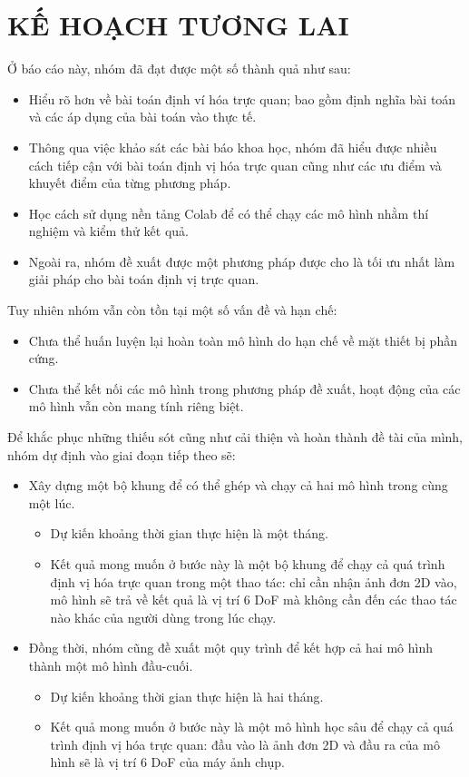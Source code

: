 \chapter{KẾ HOẠCH TƯƠNG LAI}

Ở báo cáo này, nhóm đã đạt được một số thành quả như sau:
\begin{itemize}
	\item Hiểu rõ hơn về bài toán định ví hóa trực quan; bao gồm định nghĩa bài toán và các áp dụng của bài toán vào thực tế.
	\item Thông qua việc khảo sát các bài báo khoa học, nhóm đã hiểu được nhiều cách tiếp cận với bài toán định vị hóa trực quan cũng như các ưu điểm và khuyết điểm của từng phương pháp.
	\item Học cách sử dụng nền tảng Colab để có thể chạy các mô hình nhằm thí nghiệm và kiểm thử kết quả.
	\item Ngoài ra, nhóm đề xuất được một phương pháp được cho là tối ưu nhất làm giải pháp cho bài toán định vị trực quan.
\end{itemize} 

Tuy nhiên nhóm vẫn còn tồn tại một số vấn đề và hạn chế:
\begin{itemize}
	\item Chưa thể huấn luyện lại hoàn toàn mô hình do hạn chế về mặt thiết bị phần cứng.
	\item Chưa thể kết nối các mô hình trong phương pháp đề xuất, hoạt động của các mô hình vẫn còn mang tính riêng biệt.
\end{itemize}

Để khắc phục những thiếu sót cũng như cải thiện và hoàn thành đề tài của mình, nhóm dự định vào giai đoạn tiếp theo sẽ:
\begin{itemize}
	\item Xây dựng một bộ khung để có thể ghép và chạy cả hai mô hình trong cùng một lúc.
		\begin{itemize}
			\item Dự kiến khoảng thời gian thực hiện là một tháng.
			\item Kết quả mong muốn ở bước này là một bộ khung để chạy cả quá trình định vị hóa trực quan trong một thao tác: chỉ cần nhận ảnh đơn 2D vào, mô hình sẽ trả về kết quả là vị trí 6 DoF mà không cần đến các thao tác nào khác của người dùng trong lúc chạy.
		\end{itemize}
	\item Đồng thời, nhóm cũng đề xuất một quy trình để kết hợp cả hai mô hình thành một mô hình đầu-cuối.
		\begin{itemize}
			\item Dự kiến khoảng thời gian thực hiện là hai tháng.
			\item Kết quả mong muốn ở bước này là một mô hình học sâu để chạy cả quá trình định vị hóa trực quan: đầu vào là ảnh đơn 2D và đầu ra của mô hình sẽ là vị trí 6 DoF của máy ảnh chụp.
		\end{itemize}
\end{itemize}
